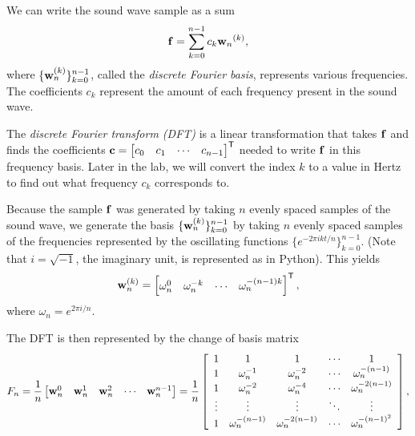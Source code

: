 We can write the sound wave sample as a sum
\begin{align}
\mathbf{f} = \sum_{k=0}^{n-1} c_k {\mathbf{w}_n}^{(k)},
\end{align}
where $\{\mathbf{w}_n^{(k)}\}_{k=0}^{n-1}$, called the \emph{discrete Fourier basis}, represents various frequencies.
The coefficients $c_k$ represent the amount of each frequency present in the sound wave. 

The \emph{discrete Fourier transform (DFT)} is a linear transformation that takes $\mathbf{f}$ and finds the coefficients  $\mathbf{c} = \begin{bmatrix}c_0 & c_1 & \cdots & c_{n-1}\end{bmatrix}^{\mathsf T}$ needed to write $\mathbf{f}$ in this frequency basis.
Later in the lab, we will convert the index $k$ to a value in Hertz to find out what frequency $c_k$ corresponds to.

Because the sample $\mathbf{f}$ was generated by taking $n$ evenly spaced samples of the sound wave, we  generate the basis $\{\mathbf{w}_n^{(k)}\}_{k=0}^{n-1}$ by taking $n$ evenly spaced samples of the frequencies represented by the oscillating functions $\{e^{-2 \pi i k t  / n}\}_{k = 0}^{n-1}$.
(Note that $i = \sqrt{-1}$, the imaginary unit, is represented as   in Python).
This yields  
\begin{align}
\mathbf{w}_n^{(k)} = \begin{bmatrix}\omega_n^0 & \omega_n^{-k} & \cdots & \omega_n^{-(n-1)k}\end{bmatrix}^{\mathsf T},
\end{align}
where $\omega_n = e^{2 \pi i / n}$.

The DFT is then represented by the change of basis matrix 
\begin{align}
F_{n} = \frac{1}{n} \begin{bmatrix}\w_n^0 & \w_n^1 & \w_n^2 & \cdots & \w_n^{n-1} \end{bmatrix}
= \frac{1}{n}\left[\begin{array}{*{5}c} 
1 & 1 & 1 & \cdots & 1 \\
1 & \omega_n^{-1} & \omega_n^{-2} & \cdots & \omega_n^{-(n-1)} \\
1 & \omega_n^{-2} & \omega_n^{-4} & \cdots & \omega_n^{-2(n-1)} \\
\vdots & \vdots & \vdots & \ddots & \vdots \\
1 & \omega_n^{-(n-1)} & \omega_n^{-2(n-1)} & \cdots & \omega_n^{-(n-1)^2} \\
 \end{array}\right],
 \label{eq:dft-matrix}
\end{align}

